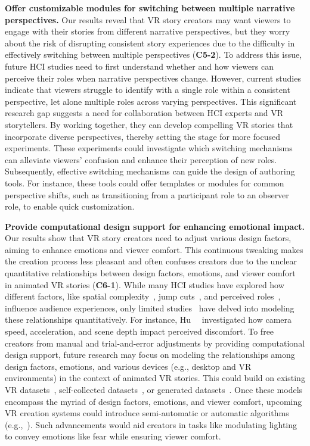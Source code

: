 \textbf{Offer customizable modules for switching between multiple narrative perspectives.}
Our results reveal that VR story creators may want viewers to engage with their stories from different narrative perspectives, but they worry about the risk of disrupting consistent story experiences due to the difficulty in effectively switching between multiple perspectives (\textbf{C5-2}).
To address this issue, future HCI studies need to first understand whether and how viewers can perceive their roles when narrative perspectives change. However, current studies~\cite{bindman2018bunny, gupta2020roleplaying} indicate that viewers struggle to identify with a single role within a consistent perspective, let alone multiple roles across varying perspectives. This significant research gap suggests a need for collaboration between HCI experts and VR storytellers. By working together, they can develop compelling VR stories that incorporate diverse perspectives, thereby setting the stage for more focused experiments. These experiments could investigate which switching mechanisms can alleviate viewers' confusion and enhance their perception of new roles. Subsequently, effective switching mechanisms can guide the design of authoring tools. For instance, these tools could offer templates or modules for common perspective shifts, such as transitioning from a participant role to an observer role, to enable quick customization.


\textbf{Provide computational design support for enhancing emotional impact.}
Our results show that VR story creators need to adjust various design factors, aiming to enhance emotions and viewer comfort. 
This continuous tweaking makes the creation process less pleasant and often confuses creators due to the unclear quantitative relationships between design factors, emotions, and viewer comfort in animated VR stories (\textbf{C6-1}). While many HCI studies have explored how different factors, like spatial complexity~\cite{shin2022spatialcomplexity, shin2019anyroom}, jump cuts~\cite{zhang2024jump}, and perceived roles~\cite{bindman2018bunny}, influence audience experiences, only limited studies~\cite{serrano2017movie, hu2019reducing, xie2024emordle} have delved into modeling these relationships quantitatively. For instance, Hu~\etal~\cite{hu2019reducing} investigated how camera speed, acceleration, and scene depth impact perceived discomfort. To free creators from manual and trial-and-error adjustments by providing computational design support, future research may focus on modeling the relationships among design factors, emotions, and various devices (e.g., desktop and VR environments) in the context of animated VR stories. This could build on existing VR datasets~\cite{xue2021ceap,sitzmann2018saliency}, self-collected datasets~\cite{hu2019reducing}, or generated datasets~\cite{yuan2024generating}. Once these models encompass the myriad of design factors, emotions, and viewer comfort, upcoming VR creation systems could introduce semi-automatic or automatic algorithms (e.g.,~\cite{cha2020enhanced, pavel2017shot, hartmann2020effect}). Such advancements would aid creators in tasks like modulating lighting to convey emotions like fear while ensuring viewer comfort.

